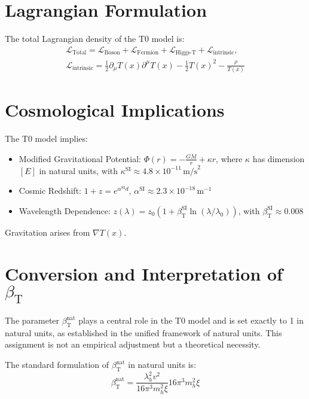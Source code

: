 \documentclass[a4paper,12pt]{article}
\newcommand{\Tfield}{T(x)}
\newcommand{\betaT}{\beta_{\text{T}}}
\begin{document}
	\section{Lagrangian Formulation}
	The total Lagrangian density of the T0 model is:
	\begin{multline}
		\mathcal{L}_{\text{Total}} = \mathcal{L}_{\text{Boson}} + \mathcal{L}_{\text{Fermion}} + \mathcal{L}_{\text{Higgs-T}} + \mathcal{L}_{\text{intrinsic}}, \\
		\mathcal{L}_{\text{intrinsic}} = \frac{1}{2} \partial_\mu \Tfield \partial^\mu \Tfield - \frac{1}{2}\Tfield^2 - \frac{\rho}{\Tfield}
	\end{multline}
	
	\section{Cosmological Implications}
	The T0 model implies:
	\begin{itemize}
		\item Modified Gravitational Potential: \( \Phi(r) = -\frac{GM}{r} + \kappa r \), where \(\kappa\) has dimension \([E]\) in natural units, with \(\kappa^{\text{SI}} \approx 4.8 \times 10^{-11} \, \text{m/s}^2 \)
		\item Cosmic Redshift: \( 1 + z = e^{\alpha^{\text{SI}} d} \), \( \alpha^{\text{SI}} \approx 2.3 \times 10^{-18} \, \text{m}^{-1} \)
		\item Wavelength Dependence: \( z(\lambda) = z_0 (1 + \betaT^{\text{SI}} \ln(\lambda/\lambda_0)) \), with \(\betaT^{\text{SI}} \approx 0.008\)
	\end{itemize}
	Gravitation arises from \( \nabla \Tfield \).
	
	\section{Conversion and Interpretation of \(\betaT\)}
	\label{subsec:beta_conversion_interpretation}
	
	The parameter \(\betaT^{\text{nat}}\) plays a central role in the T0 model and is set exactly to 1 in natural units, as established in the unified framework of natural units. This assignment is not an empirical adjustment but a theoretical necessity.
	
	The standard formulation of \(\betaT^{\text{nat}}\) in natural units is:
	\begin{equation}
		\betaT^{\text{nat}} = \frac{\lambda_h^2 v^2}{16\pi^3 m_h^2 \xi}{16\pi^3 m_h^2 \xi}
	\end{equation}
	
\end{document}
